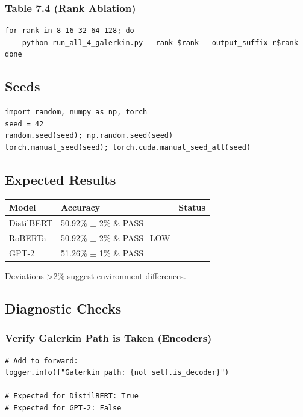 \subsubsection{Table 7.4 (Rank Ablation)}

\begin{lstlisting}
for rank in 8 16 32 64 128; do
    python run_all_4_galerkin.py --rank $rank --output_suffix r$rank
done
\end{lstlisting}

\subsection{Seeds}

\begin{lstlisting}
import random, numpy as np, torch
seed = 42
random.seed(seed); np.random.seed(seed)
torch.manual_seed(seed); torch.cuda.manual_seed_all(seed)
\end{lstlisting}

\subsection{Expected Results}

\begin{table}[H]
\centering
\small
\begin{tabular}{lll}
\toprule
\textbf{Model} & \textbf{Accuracy} & \textbf{Status} \\
\midrule
DistilBERT & 50.92\% $\pm$ 2\% \& PASS \\
RoBERTa & 50.92\% $\pm$ 2\% \& PASS\_LOW \\
GPT-2 & 51.26\% $\pm$ 1\% \& PASS \\
\bottomrule
\end{tabular}
\end{table}

Deviations >2\% suggest environment differences.

\subsection{Diagnostic Checks}

\subsubsection{Verify Galerkin Path is Taken (Encoders)}

\begin{lstlisting}
# Add to forward:
logger.info(f"Galerkin path: {not self.is_decoder}")

# Expected for DistilBERT: True
# Expected for GPT-2: False
\end{lstlisting}

